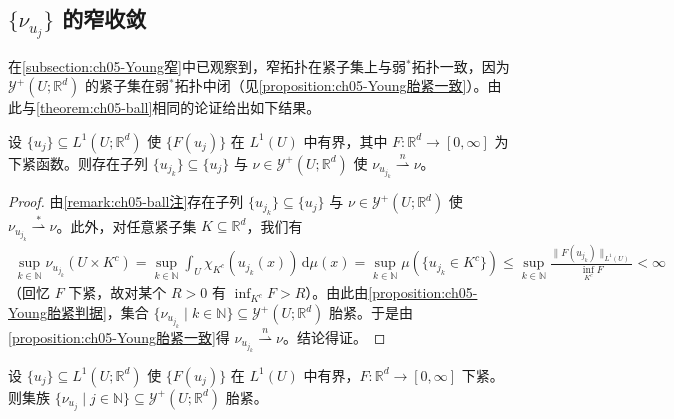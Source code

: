 \documentclass[../../main.tex]{subfiles}%
\begin{document}
\subsection{$\{\nu_{u_j}\}$ 的窄收敛}

在\cref{subsection:ch05-Young窄}中已观察到，窄拓扑在紧子集上与弱$^*$拓扑一致，因为 $\mathcal{Y}^+(U;\mathbb{R}^d)$ 的紧子集在弱$^*$拓扑中闭（见\cref{proposition:ch05-Young胎紧一致}）。由此与\cref{theorem:ch05-ball}相同的论证给出如下结果。

\begin{theorem}\label{theorem:ch05-函数窄收敛}\label{proposition:ch05-5.4.1}\label{proposition:ch05-弱收敛}
设 $\{u_j\}\subseteq L^1(U;\mathbb{R}^d)$ 使 $\{F(u_j)\}$ 在 $L^1(U)$ 中有界，其中 $F:\mathbb{R}^d\to[0,\infty]$ 为下紧函数。则存在子列 $\{u_{j_k}\}\subseteq\{u_j\}$ 与 $\nu\in\mathcal{Y}^+(U;\mathbb{R}^d)$ 使 $\nu_{u_{j_k}}\stackrel{n}{\rightharpoonup}\nu$。
\end{theorem}

\begin{proof}
由\cref{remark:ch05-ball注}存在子列 $\{u_{j_k}\}\subseteq\{u_j\}$ 与 $\nu\in\mathcal{Y}^+(U;\mathbb{R}^d)$ 使 $\nu_{u_{j_k}}\stackrel{*}{\rightharpoonup}\nu$。此外，对任意紧子集 $K\subseteq\mathbb{R}^d$，我们有
\begin{align*}
\sup_{k\in\mathbb{N}}\nu_{u_{j_k}}(U\times K^c)
=\sup_{k\in\mathbb{N}}\int_U\chi_{K^c}(u_{j_k}(x))\,\mathrm{d}\mu(x)
=\sup_{k\in\mathbb{N}}\mu(\{u_{j_k}\in K^c\})
\leqslant\sup_{k\in\mathbb{N}}\frac{\|F(u_{j_k})\|_{L^1(U)}}{\inf_{K^c}F}<\infty
\end{align*}
（回忆 $F$ 下紧，故对某个 $R>0$ 有 $\inf_{K^c}F>R$）。由此由\cref{proposition:ch05-Young胎紧判据}，集合 $\{\nu_{u_{j_k}}\mid k\in\mathbb{N}\}\subseteq\mathcal{Y}^+(U;\mathbb{R}^d)$ 胎紧。于是由\cref{proposition:ch05-Young胎紧一致}得 $\nu_{u_{j_k}}\stackrel{n}{\rightharpoonup}\nu$。结论得证。
\end{proof}

\begin{proposition}\label{proposition:ch05-有界紧}\label{proposition:ch05-弱星紧}
设 $\{u_j\}\subseteq L^1(U;\mathbb{R}^d)$ 使 $\{F(u_j)\}$ 在 $L^1(U)$ 中有界，$F:\mathbb{R}^d\to[0,\infty]$ 下紧。则集族 $\{\nu_{u_j}\mid j\in\mathbb{N}\}\subseteq\mathcal{Y}^+(U;\mathbb{R}^d)$ 胎紧。
\end{proposition}
\end{document}
